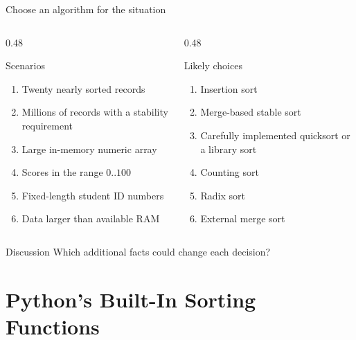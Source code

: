 \documentclass[aspectratio=169]{beamer}
\begin{document}
\begin{frame}{Choose an algorithm for the situation}
  \begin{columns}[T]
    \begin{column}{0.48\textwidth}
      \begin{block}{Scenarios}
        \begin{enumerate}
          \item Twenty nearly sorted records
          \item Millions of records with a stability requirement
          \item Large in-memory numeric array
          \item Scores in the range $0..100$
          \item Fixed-length student ID numbers
          \item Data larger than available RAM
        \end{enumerate}
      \end{block}
    \end{column}
    \begin{column}{0.48\textwidth}
      \begin{exampleblock}{Likely choices}
        \begin{enumerate}
          \item Insertion sort
          \item Merge-based stable sort
          \item Carefully implemented quicksort or a library sort
          \item Counting sort
          \item Radix sort
          \item External merge sort
        \end{enumerate}
      \end{exampleblock}
    \end{column}
  \end{columns}
  \begin{alertblock}{Discussion}
    Which additional facts could change each decision?
  \end{alertblock}
\end{frame}

\section{Python's Built-In Sorting Functions}
\end{document}
